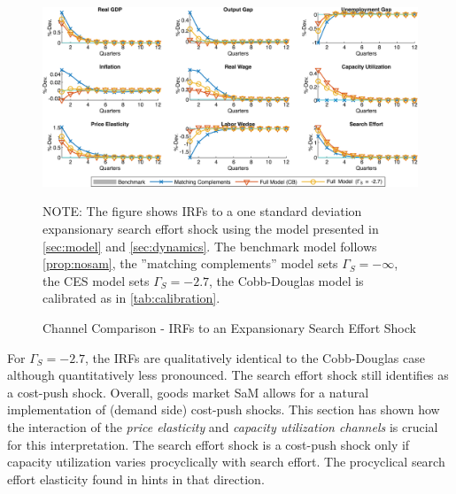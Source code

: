 \documentclass[12pt,3p,authoryear,review]{elsarticle}
\begin{document}
\begin{figure}[t]%
	\centering%
	\caption{Channel Comparison - IRFs to an Expansionary Search Effort Shock}\label{fig:irf_default_search_effort}%
	\vspace{-0.1in}%
	\includegraphics[width=\textwidth]{fig_7_irf_default_search.png}%
	\vspace{-0.1in}%
	{\tiny \singlespacing NOTE: The figure shows IRFs to a one standard deviation expansionary search effort shock using the model presented in \cref{sec:model} and \cref{sec:dynamics}. The benchmark model follows \cref{prop:nosam}, the ''matching complements'' model sets $\Gamma_S = -\infty$, the CES model sets $\Gamma_S = -2.7$, the Cobb-Douglas model is calibrated as in \cref{tab:calibration}.\par}%
\end{figure}%
For $\Gamma_S = -2.7$, the IRFs are qualitatively identical to the Cobb-Douglas case although quantitatively less pronounced. The search effort shock still identifies as a cost-push shock. Overall, goods market SaM allows for a natural implementation of (demand side) cost-push shocks. This section has shown how the interaction of the \emph{price elasticity} and \emph{capacity utilization channels} is crucial for this interpretation. The search effort shock is a cost-push shock only if capacity utilization varies procyclically with search effort. The procyclical search effort elasticity found in \cite{petrosky-nadeauShoppingTime2016} hints in that direction.%
\end{document}
